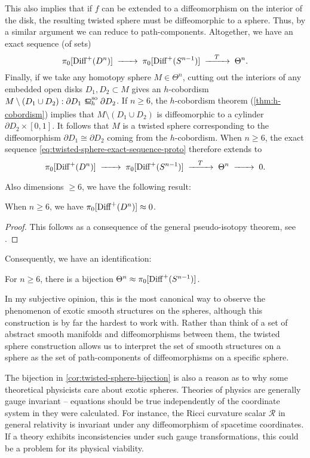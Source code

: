 	This also implies that if $f$ can be extended to a diffeomorphism on the interior of the disk, the resulting twisted sphere must be diffeomorphic to a sphere. Thus, by a similar argument we can reduce to path-components. Altogether, we have an exact sequence (of sets)
	\begin{equation}\label{eq:twisted-sphere-exact-sequence-proto}
		\pi_0 [\Diff^+(D^n)] \lkxto \pi_0 [\Diff^+(S^{n-1})] \lkxto[T] \Theta^n.
	\end{equation}
	Finally, if we take any homotopy sphere $M\in \Theta^n$, cutting out the interiors of any embedded open disks $D_1, D_2\subset M$ gives an $h$-cobordism $M\setminus(D_1\cup D_2) : \partial D_1 \sohbord \partial D_2$. If $n\geq 6$, the $h$-cobordism theorem (\ref{thm:h-cobordism}) implies that $M \setminus (D_1\cup D_2)$ is diffeomorphic to a cylinder $\partial D_2\times [0,1]$. It follows that $M$ is a twisted sphere corresponding to the diffeomorphism $\partial D_1 \cong \partial D_2$ coming from the $h$-cobordism.
	When $n\geq 6$, the exact sequence \cref{eq:twisted-sphere-exact-sequence-proto} therefore extends to 
	\[
		\pi_0 [\Diff^+(D^n)] \lkxto \pi_0 [\Diff^+(S^{n-1})] \lkxto[T] \Theta^n \lkxto 0.
	\]

	Also dimensions $\geq 6$, we have the following result:
	\begin{theorem}[Cerf]
		When $n\geq 6$, we have $\pi_0[\operatorname{Diff}^+(D^n)]\approx 0$.
	\end{theorem}
	\begin{proof}
		This follows as a consequence of the general pseudo-isotopy theorem, see \cite{cerf1970pseudoisotopy}.
	\end{proof}

	Consequently, we have an identification:

	\begin{corollary}\label{cor:twisted-sphere-bijection}
		For $n\geq 6$, there is a bijection $\Theta^n \approx \pi_0[\operatorname{Diff}^+(S^{n-1})]$.
	\end{corollary}

	In my subjective opinion, this is the most canonical way to observe the phenomenon of exotic smooth structures on the spheres, although this construction is by far the hardest to work with. Rather than think of a set of abstract smooth manifolds and diffeomorphisms between them, the twisted sphere construction allows us to interpret the set of smooth structures on a sphere as the set of path-components of diffeomorphisms on a specific sphere. 

	The bijection in \cref{cor:twisted-sphere-bijection} is also a reason as to why some theoretical physicists care about exotic spheres. Theories of physics are generally gauge invariant -- equations should be true independently of the coordinate system in they were calculated.
	For instance, the Ricci curvature scalar $\mathcal{R}$ in general relativity is invariant under any diffeomorphism of spacetime coordinates. If a theory exhibits inconsistencies under such gauge transformations, this could be a problem for its physical viability.

